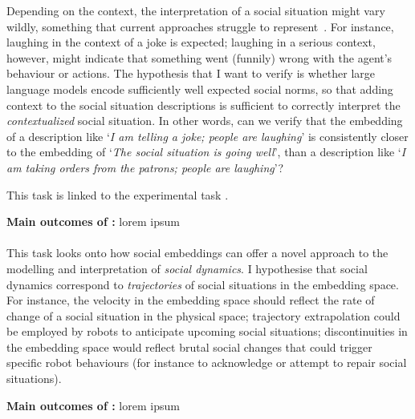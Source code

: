 Depending on the context, the interpretation of a social situation might vary
wildly, something that current approaches struggle to
represent~\cite{yang2018grand}. For instance, laughing in the context of a joke
is expected; laughing in a serious context, however, might indicate that
something went (funnily) wrong with the agent's behaviour or actions. The
hypothesis that I want to verify is whether large language models encode
sufficiently well expected social norms, so that adding context to the social
situation descriptions is sufficient to correctly interpret the
\emph{contextualized} social situation. In other words, can we verify that the
embedding of a description like `\emph{I am telling a joke; people are
laughing}' is consistently closer to the embedding of `\emph{The social
situation is going well}', than a description like `\emph{I am taking orders
from the patrons; people are laughing}'?




This task is linked to the experimental task \TDB.


\begin{framed}
    {\noindent\bf Main outcomes of \tBA:} lorem ipsum 
\end{framed}

\paragraph{\TBB}

This task looks onto how social embeddings can offer a novel approach to the
modelling and interpretation of \emph{social dynamics}. I hypothesise that
social dynamics correspond to \emph{trajectories} of social situations in the
embedding space.  For instance, the velocity in the embedding space should
reflect the rate of change of a social situation in the physical space;
trajectory extrapolation could be employed by robots to anticipate upcoming
social situations; discontinuities in the embedding space would reflect brutal
social changes that could trigger specific robot behaviours (for instance to
acknowledge or attempt to repair social situations).  


\begin{framed}
    {\noindent\bf Main outcomes of \tBC:} lorem ipsum 
\end{framed}

\paragraph{\TBC}

